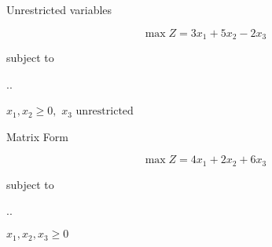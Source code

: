 \begin{frameExample}{Unrestricted variables \label{example:02.12-05}}{}
  
    \[ \max Z = 3x_1 + 5x_2 - 2x_3\]
    {\centering
      subject to

      \sysdelim..%
    \par}

  \vspace{3mm}
  $    x_1, x_2 \geq 0,$
    $x_3  \text{ unrestricted}$
\end{frameExample}

\begin{frameExample}{Matrix Form\label{example:02.12-06}}{}
        
    \[\max Z = 4x_1 + 2x_2 + 6x_3 \]

    {\centering
      subject to

      \sysdelim..%

      \vspace{3mm}
      $x_1, x_2,x_3  \geq 0$
    \par}

\end{frameExample}



